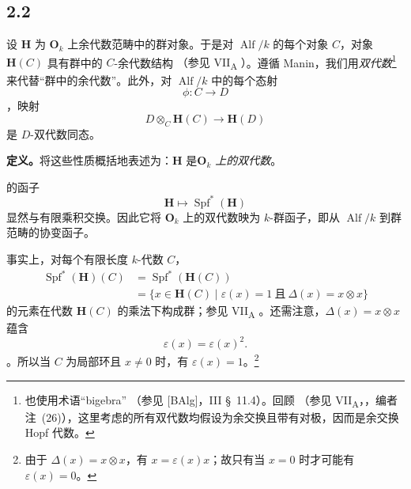 \subsection*{2.2} \label{sga3:VIIB:2.2}

设 \(\mathbf H\) 为 \(\mathbf O_k\) 上余代数范畴中的群对象。于是对 \(\operatorname{Alf}/k\) 的每个对象 \(C\)，对象 \(\mathbf H(C)\) 具有群中的 \(C\)-余代数结构 \textup{（参见 VII\textsubscript{A} ）}。遵循 Manin，我们用\emph{双代数}\footnote{\label{sga3:VIIB:nde:77}也使用术语“bigebra” \textup{（参见 [BAlg]，III \S~11.4）}。回顾 \textup{（参见 VII\textsubscript{A}，，编者注~(26)）}，这里考虑的所有双代数均假设为余交换且带有对极，因而是余交换 Hopf 代数。}来代替“群中的余代数”。此外，对 \(\operatorname{Alf}/k\) 中的每个态射 \[
  \phi:C\longrightarrow D
\]，映射 \[
  D\otimes_C\mathbf H(C)\longrightarrow\mathbf H(D)
\] 是 \(D\)-双代数同态。

\medskip\noindent\textbf{定义。} \label{sga3:VIIB:2.2.definition}将这些性质概括地表述为：\(\mathbf H\) 是\emph{\(\mathbf O_k\) 上的双代数}。

 的函子 \[
  \mathbf H\longmapsto\operatorname{Spf}^*(\mathbf H)
\] 显然与有限乘积交换。因此它将 \(\mathbf O_k\) 上的双代数映为 \(k\)-群函子，即从 \(\operatorname{Alf}/k\) 到群范畴的协变函子。

事实上，对每个有限长度 \(k\)-代数 \(C\)，\[
\begin{aligned}
  \operatorname{Spf}^*(\mathbf H)(C)
  &=
  \operatorname{Spf}^*(\mathbf H(C))
  \\
  &=
  \bigl\{
    x\in\mathbf H(C)
    \mid
    \varepsilon(x)=1
    \ \text{且}\
    \Delta(x)=x\otimes x
  \bigr\}
\end{aligned}
\] 的元素在代数 \(\mathbf H(C)\) 的乘法下构成群；参见 VII\textsubscript{A} 。还需注意，\(\Delta(x)=x\otimes x\) 蕴含 \[
  \varepsilon(x)=\varepsilon(x)^2.
\]。所以当 \(C\) 为局部环且 \(x\neq0\) 时，有 \(\varepsilon(x)=1\)。\footnote{\label{sga3:VIIB:nde:78}由于 \(\Delta(x)=x\otimes x\)，有 \(x=\varepsilon(x)x\)；故只有当 \(x=0\) 时才可能有 \(\varepsilon(x)=0\)。}
